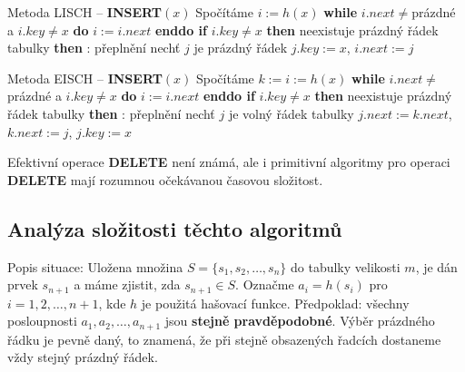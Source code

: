 \documentclass[a4paper,12pt]{article}
\begin{document}
Metoda LISCH -- {\bf INSERT$(x)$}\newline 
Spočítáme $i:=h(x)$\newline 
{\bf while} $i.next\ne$prázdné a $i.key\ne x$ {\bf do} $i:=i.
next$ {\bf enddo \newline 
if} $i.key\ne x$ {\bf then}\newline 
\phantom{---}{\bf if} neexistuje prázdný řádek tabulky {\bf then}\newline 
\phantom{------}{\bf Výstup}: přeplnění\newline 
\phantom{---}{\bf else}\newline 
\phantom{------}nechť $j$ je prázdný řádek $j.
key:=x$, 
$i.next:=j$\newline 
\phantom{---}{\bf endif\newline 
endif}


Metoda EISCH -- {\bf INSERT$(x)$}\newline 
Spočítáme $k:=i:=h(x)$\newline 
{\bf while} $i.next\ne$prázdné a $i.key\ne x$ {\bf do} $i:=i.
next$ {\bf enddo \newline 
if} $i.key\ne x$ {\bf then}\newline 
\phantom{---}{\bf if} neexistuje prázdný řádek tabulky {\bf then}\newline 
\phantom{------}{\bf Výstup}: přeplnění\newline 
\phantom{---}{\bf else}\newline 
\phantom{------}nechť $j$ je volný řádek tabulky\newline 
\phantom{------}$j.next:=k.next$, $k.next:=j$, $j.key:=x$\newline 
\phantom{---}{\bf endif\newline 
endif}


Efektivní operace {\bf DELETE}  není známá, ale i primitivní 
algoritmy pro operaci {\bf DELETE} mají rozumnou očekávanou 
časovou složitost.

\subsection{
Analýza složitosti těchto algoritmů
}

Popis situace: Uložena množina 
$S=\{s_1,s_2,\dots,s_n\}$ do ta\-bulky velikosti $m$, je dán 
prvek $s_{n+1}$ a máme zjistit, zda $s_{n+1}\in S$. Označme 
$a_i=h(s_i)$ pro $i=1,2,\dots,n+1$, kde $h$ je použitá hašovací 
funkce.\newline 
Předpoklad: všechny posloupnosti $a_1,a_2,\dots,a_{n+1}$ jsou 
{\bf stejně pravděpodobné}. Výběr prázdného řádku je 
pevně daný, to znamená, že při stejně obsazených 
řadcích dostaneme vždy stejný prázdný řádek.  
\end{document}
